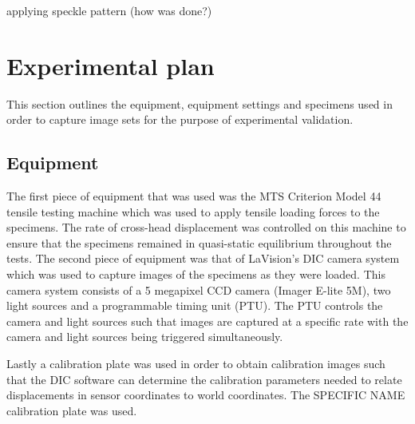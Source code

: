 \documentclass[12pt,oneside,openany,a4paper, %
english, %
masters-t, goldenblock]{usthesis}
\begin{document}



applying speckle pattern (how was done?)






\section{Experimental plan}
This section outlines the equipment, equipment settings and specimens used in order to capture image sets for the purpose of experimental validation.

\subsection{Equipment}
The first piece of equipment that was used was the MTS Criterion Model 44 tensile testing machine which was used to apply tensile loading forces to the specimens. The rate of cross-head displacement was controlled on this machine to ensure that the specimens remained in quasi-static equilibrium throughout the tests. The second piece of equipment was that of LaVision's DIC camera system which was used to capture images of the specimens as they were loaded. This camera system consists of a 5 megapixel CCD camera (Imager E-lite 5M), two light sources and a programmable timing unit (PTU). The PTU controls the camera and light sources such that images are captured at a specific rate with the camera and light sources being triggered simultaneously.

Lastly a calibration plate was used in order to obtain calibration images such that the DIC software can determine the calibration parameters needed to relate displacements in sensor coordinates to world coordinates. The SPECIFIC NAME calibration plate was used.
\end{document}
